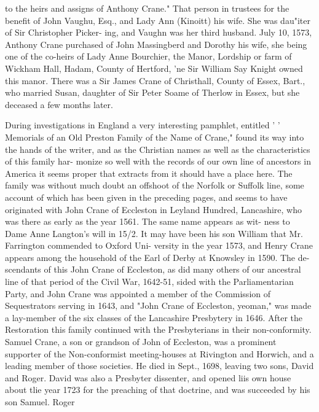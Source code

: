 \documentclass{book}
\begin{document}
to the heirs and assigns of Anthony Crane." That person in 
trustees for the benefit of John Vaughu, Esq., and Lady Ann 
(Kinoitt) his wife. She was dau"iter of Sir Christopher Picker- 
ing, and Vaughn was her third husband. July 10, 1573, Anthony 
Crane purchased of John Massingberd and Dorothy his wife, she 
being one of the co-heirs of Lady Anne Bourchier, the Manor, 
Lordship or farm of Wickham Hall, Hadam, County of Hertford, 
'ne Sir William Say Knight owned this manor. There was a Sir 
James Crane of Christhall, County of Essex, Bart., who married 
Susan, daughter of Sir Peter Soame of Therlow in Essex, but she 
deceased a few months later. 

During investigations in England a very interesting pamphlet, 
entitled ' ' Memorials of an Old Preston Family of the Name of 
Crane," found its way into the hands of the writer, and as the 
Christian names as well as the characteristics of this family har- 
monize so well with the records of our own line of ancestors in 
America it seems proper that extracts from it should have a 
place here. The family was without much doubt an offshoot of 
the Norfolk or Suffolk line, some account of which has been given 
in the preceding pages, and seems to have originated with John 
Crane of Eccleston in Leyland Hundred, Lancashire, who was 
there as early as the year 1561. The same name appears as wit- 
ness to Dame Anne Langton's will in 15/2. It may have been 
his son William that Mr. Farrington commended to Oxford Uni- 
versity in the year 1573, and Henry Crane appears among the 
household of the Earl of Derby at Knowsley in 1590. The de- 
scendants of this John Crane of Eccleston, as did many others of 
our ancestral line of that period of the Civil War, 1642-51, sided 
with the Parliamentarian Party, and John Crane was appointed a 
member of the Commission of Sequestrators serving in 1643, and 
"John Crane of Eccleston, yeoman," was made a lay-member of 
the six classes of the Lancashire Presbytery in 1646. After the 
Restoration this family continued with the Presbyterians in their 
non-conformity. Samuel Crane, a son or grandson of John of 
Eccleston, was a prominent supporter of the Non-conformist 
meeting-houses at Rivington and Horwich, and a leading member 
of those societies. He died in Sept., 1698, leaving two sons, 
David and Roger. David was also a Presbyter dissenter, and 
opened liis own house about tlie year 1723 for the preaching of 
that doctrine, and was succeeded by his son Samuel. Roger 
\end{document}
